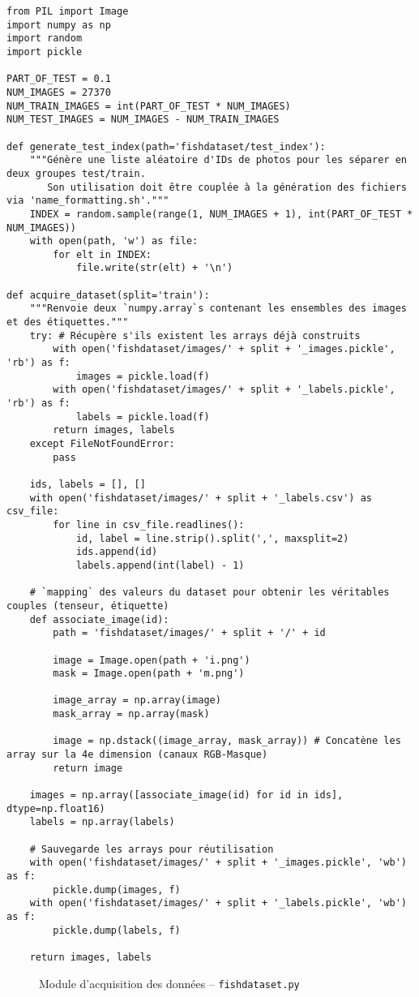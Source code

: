 \documentclass{article}
\begin{document}
  \begin{lstlisting}[style=Py]
from PIL import Image
import numpy as np
import random
import pickle

PART_OF_TEST = 0.1
NUM_IMAGES = 27370
NUM_TRAIN_IMAGES = int(PART_OF_TEST * NUM_IMAGES)
NUM_TEST_IMAGES = NUM_IMAGES - NUM_TRAIN_IMAGES

def generate_test_index(path='fishdataset/test_index'):
    """Génère une liste aléatoire d'IDs de photos pour les séparer en deux groupes test/train.
       Son utilisation doit être couplée à la génération des fichiers via 'name_formatting.sh'."""
    INDEX = random.sample(range(1, NUM_IMAGES + 1), int(PART_OF_TEST * NUM_IMAGES))
    with open(path, 'w') as file:
        for elt in INDEX:
            file.write(str(elt) + '\n')

def acquire_dataset(split='train'):
    """Renvoie deux `numpy.array`s contenant les ensembles des images et des étiquettes."""
    try: # Récupère s'ils existent les arrays déjà construits
        with open('fishdataset/images/' + split + '_images.pickle', 'rb') as f:
            images = pickle.load(f)
        with open('fishdataset/images/' + split + '_labels.pickle', 'rb') as f:
            labels = pickle.load(f)
        return images, labels
    except FileNotFoundError:
        pass

    ids, labels = [], []
    with open('fishdataset/images/' + split + '_labels.csv') as csv_file:
        for line in csv_file.readlines():
            id, label = line.strip().split(',', maxsplit=2)
            ids.append(id)
            labels.append(int(label) - 1)

    # `mapping` des valeurs du dataset pour obtenir les véritables couples (tenseur, étiquette)
    def associate_image(id):
        path = 'fishdataset/images/' + split + '/' + id

        image = Image.open(path + 'i.png')
        mask = Image.open(path + 'm.png')

        image_array = np.array(image)
        mask_array = np.array(mask)

        image = np.dstack((image_array, mask_array)) # Concatène les array sur la 4e dimension (canaux RGB-Masque)
        return image

    images = np.array([associate_image(id) for id in ids], dtype=np.float16)
    labels = np.array(labels)

    # Sauvegarde les arrays pour réutilisation
    with open('fishdataset/images/' + split + '_images.pickle', 'wb') as f:
        pickle.dump(images, f)
    with open('fishdataset/images/' + split + '_labels.pickle', 'wb') as f:
        pickle.dump(labels, f)

    return images, labels
  \end{lstlisting}
  \vspace*{-0.3cm}
  \begin{figure}[ht] %
    \caption{Module d'acquisition des données -- \texttt{fishdataset.py}}
  \end{figure}
\end{document}

